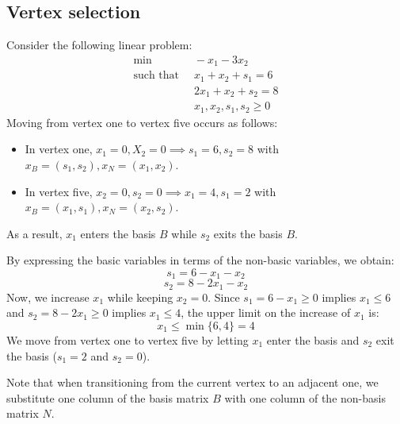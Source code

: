 \newpage
\subsection{Vertex selection}
\begin{example}
    Consider the following linear problem:
    \begin{align*}
        \min                      \:&\: -x_1-3x_2          \\
        \text{such that }     &\: x_1+x_2+s_1 = 6  \\
                                    &\: 2x_1+x_2+s_2 = 8  \\
                                    &\: x_1,x_2,s_1,s_2 \geq 0
    \end{align*}
    Moving from vertex one to vertex five occurs as follows:
    \begin{itemize}
        \item In vertex one, $x_1 = 0, X_2=0 \implies s_1 = 6, s_2 = 8$ with $x_B = (s_1, s_2), x_N = (x_1, x_2)$.
        \item In vertex five, $x_2=0,s_2=0 \implies x_1=4,s_1=2$ with $x_B = (x_1, s_1), x_N = (x_2, s_2)$.
    \end{itemize}
    As a result, $x_1$ enters the basis $B$ while $s_2$ exits the basis $B$.

    By expressing the basic variables in terms of the non-basic variables, we obtain:
    \[s_1=6-x_1-x_2\]
    \[s_2=8-2x_1-x_2\]
    Now, we increase $x_1$ while keeping $x_2 = 0$.
    Since $s_1=6-x_1 \geq 0$ implies $x_1 \leq 6$ and $s_2=8-2x_1 \geq 0$ implies $x_1 \leq 4$, the upper limit on the increase of $x_1$ is: 
    \[x_1 \leq \min\{6,4\}=4\]
    We move from vertex one to vertex five by letting $x_1$ enter the basis and $s_2$ exit the basis ($s_1=2$ and $s_2=0$). 
\end{example}
Note that when transitioning from the current vertex to an adjacent one, we substitute one column of the basis matrix $B$ with one column of the non-basis matrix $N$.

